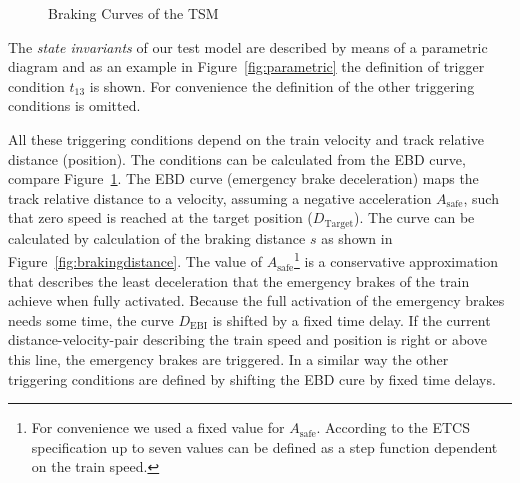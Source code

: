\begin{figure}[b]
\centering
{}
\caption{Braking Curves of the TSM}
\label{fig:braking-curves}
\end{figure}   

The \emph{state invariants} of our test model are described by means of a parametric diagram and as an example in Figure~\ref{fig:parametric} the definition of trigger condition $t_{13}$ is shown. For convenience the definition of the other triggering conditions is omitted. 


All these triggering conditions depend on the train velocity and track relative
distance (position). The conditions can be calculated from the EBD
curve, compare Figure~\ref{fig:braking-curves}.
The EBD curve (emergency brake deceleration) maps the track relative distance to a
velocity, assuming a negative acceleration $A_\text{safe}$, such that zero speed is reached
at the target position ($D_\text{Target}$). The curve can be calculated by calculation of the 
braking distance $s$ as shown in Figure~\ref{fig:brakingdistance}.
The value of $A_\text{safe}$\footnote{For convenience we used a fixed value for
$A_\text{safe}$. According to the ETCS specification
\cite{ETCSSRS-Principles} up to seven values can be defined as a step function
dependent on the train speed.} is a conservative approximation that describes
the least deceleration that the emergency brakes of the train achieve when
fully activated.
Because the full activation of the emergency brakes needs some time, the curve
$D_\text{EBI}$ is shifted by a fixed time delay.
If the current distance-velocity-pair describing the train speed and position is
right or above this line, the emergency brakes are triggered.
In a similar way the other triggering conditions are defined by shifting the EBD
cure by fixed time delays.
   

